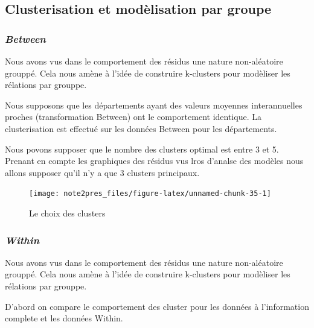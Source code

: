 \documentclass[11pt,]{article}
\begin{document}
\FloatBarrier

\hypertarget{clusterisation-et-modelisation-par-groupe}{%
\subsection{Clusterisation et modèlisation par
groupe}\label{clusterisation-et-modelisation-par-groupe}}

\hypertarget{between}{%
\subsubsection{\texorpdfstring{\emph{Between}}{Between}}\label{between}}

Nous avons vus dans le comportement des résidus une nature non-aléatoire
grouppé. Cela nous amène à l'idée de construire k-clusters pour
modèliser les rélations par grouppe.

Nous supposons que les départements ayant des valeurs moyennes
interannuelles proches (transformation Between) ont le comportement
identique. La clusterisation est effectué sur les données Between pour
les départements.

Nous povons supposer que le nombre des clusters optimal est entre 3 et
5. Prenant en compte les graphiques des résidus vus lros d'analse des
modèles nous allons supposer qu'il n'y a que 3 clusters principaux.

\FloatBarrier

\begin{figure}[!htbp]

{\centering \texttt{[image: note2pres\_files/figure-latex/unnamed-chunk-35-1]} 

}

\caption{Le choix des clusters}\label{fig:unnamed-chunk-35}
\end{figure}

\FloatBarrier

\hypertarget{within}{%
\subsubsection{\texorpdfstring{\emph{Within}}{Within}}\label{within}}

Nous avons vus dans le comportement des résidus une nature non-aléatoire
grouppé. Cela nous amène à l'idée de construire k-clusters pour
modèliser les rélations par grouppe.

D'abord on compare le comportement des cluster pour les données à
l'information complete et les données Within.
\end{document}
